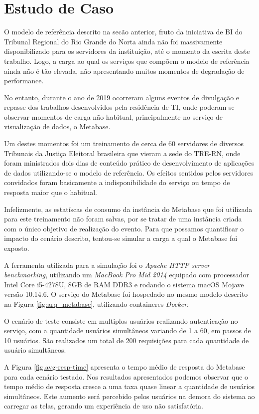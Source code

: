 \section{Estudo de Caso}

O modelo de referência descrito na secão anterior, fruto da iniciativa de BI do Tribunal Regional do Rio Grande do Norta ainda não foi massivamente disponibilizado para os servidores da instituição, até o momento da escrita deste trabalho. Logo, a carga ao qual os serviços que compõem o modelo de referência ainda não é tão elevada, não apresentando muitos momentos de degradação de performance.

No entanto, durante o ano de 2019 ocorreram alguns eventos de divulgação e repasse dos trabalhos desenvolvidos pela residência de TI, onde poderam-se observar momentos de carga não habitual, principalmente no serviço de visualização de dados, o Metabase.

Um destes momentos foi um treinamento de cerca de 60 servidores de diversos Tribunais da Justiça Eleitoral brasileira que vieram a sede do TRE-RN, onde foram ministrados dois dias de conteúdo prático de desenvolvimento de aplicações de dados utilizando-se o modelo de referência. Os efeitos sentidos pelos servidores convidados foram basicamente a indisponibilidade do serviço ou tempo de resposta maior que o habitual.

Infelizmente, as estatíscas de consumo da instância do Metabase que foi utilizada para este treinamento não foram salvas, por se tratar de uma instância criada com o único objetivo de realização do evento. Para que possamos quantificar o impacto do cenário descrito, tentou-se simular a carga a qual o Metabase foi exposto.

A ferramenta utilizada para a simulação foi o \textit{Apache HTTP server benchmarking}, utilizando um \textit{MacBook Pro Mid 2014} equipado com processador Intel Core i5-4278U, 8GB de RAM DDR3 e rodando o sistema macOS Mojave versão 10.14.6. O serviço do Metabase foi hospedado no mesmo modelo descrito na Figura \ref{fig:arq_metabase}, utilizando containeres \textit{Docker}. 

O cenário de teste consiste em multiplos usuários realizando autenticação no serviço, com a quantidade usuários simultâneos variando de 1 a 60, em passos de 10 usuários. São realizados um total de 200 requisições para cada quantidade de usuário simultâneos. 

A Figura \ref{fig.avg-resp-time} apresenta o tempo médio de resposta do Metabase para cada cenário testado. Nos resultados apresentados podemos observar que o tempo médio de resposta cresce a uma taxa quase linear a quantidade de usuários simultâneos. Este aumento será percebido pelos usuários na demora do sistema ao carregar as telas, gerando um experiência de uso não satisfatória. 

